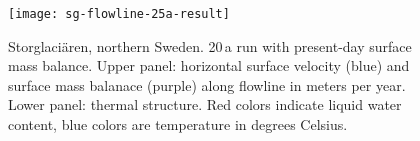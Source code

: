 \begin{figure}[ht]
  \centering
  \texttt{[image: sg-flowline-25a-result]}
  \caption{Storglaci{\"a}ren, northern Sweden. 20\,a run with present-day surface mass balance. Upper panel: horizontal surface velocity (blue) and surface mass balanace (purple) along flowline in meters per year. Lower panel: thermal structure. Red colors indicate liquid water content, blue colors are temperature in degrees Celsius.}
  \label{fig:storglaciaren-25a-result}
\end{figure}
